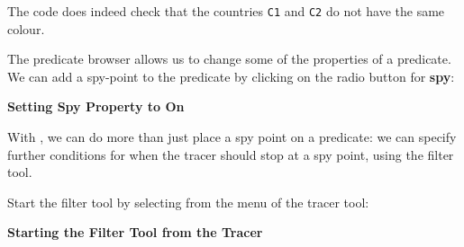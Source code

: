 The code does indeed check that the countries \verb'C1' and \verb'C2' do
not have the same colour.


The predicate browser allows us to change some of the properties of a predicate.
We can add a spy-point to the predicate by clicking on the radio button for
{\bf spy}: 

\begin{center}

\vspace{2mm}
{\bf Setting Spy Property to On}
\end{center}

With {\tkeclipse}, we can do more than just place a spy point on a
predicate: we can specify further conditions for when the tracer should
stop at a spy point, using the filter tool. 

Start the filter tool by selecting  from the  menu of the tracer
tool:

\begin{center}

\vspace{3mm}
{\bf Starting the Filter Tool from the Tracer}
\end{center}

